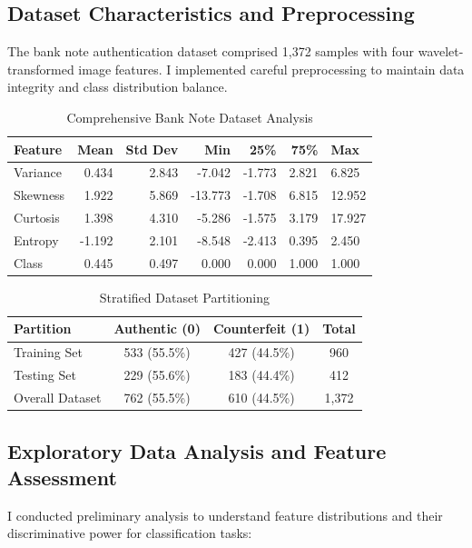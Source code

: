 \documentclass[12pt,a4paper]{article}
\begin{document}
\subsection{Dataset Characteristics and Preprocessing}
The bank note authentication dataset comprised 1,372 samples with four wavelet-transformed image features. I implemented careful preprocessing to maintain data integrity and class distribution balance.

\begin{table}[H]
\centering
\caption{Comprehensive Bank Note Dataset Analysis}
\begin{tabular}{lrrrrr}
\toprule
\textbf{Feature} & \textbf{Mean} & \textbf{Std Dev} & \textbf{Min} & \textbf{25\%} & \textbf{75\%} & \textbf{Max} \\
\midrule
Variance & 0.434 & 2.843 & -7.042 & -1.773 & 2.821 & 6.825 \\
Skewness & 1.922 & 5.869 & -13.773 & -1.708 & 6.815 & 12.952 \\
Curtosis & 1.398 & 4.310 & -5.286 & -1.575 & 3.179 & 17.927 \\
Entropy & -1.192 & 2.101 & -8.548 & -2.413 & 0.395 & 2.450 \\
Class & 0.445 & 0.497 & 0.000 & 0.000 & 1.000 & 1.000 \\
\bottomrule
\end{tabular}
\end{table}

\begin{table}[H]
\centering
\caption{Stratified Dataset Partitioning}
\begin{tabular}{lccc}
\toprule
\textbf{Partition} & \textbf{Authentic (0)} & \textbf{Counterfeit (1)} & \textbf{Total} \\
\midrule
Training Set & 533 (55.5\%) & 427 (44.5\%) & 960 \\
Testing Set & 229 (55.6\%) & 183 (44.4\%) & 412 \\
Overall Dataset & 762 (55.5\%) & 610 (44.5\%) & 1,372 \\
\bottomrule
\end{tabular}
\end{table}

\subsection{Exploratory Data Analysis and Feature Assessment}
I conducted preliminary analysis to understand feature distributions and their discriminative power for classification tasks:
\end{document}
